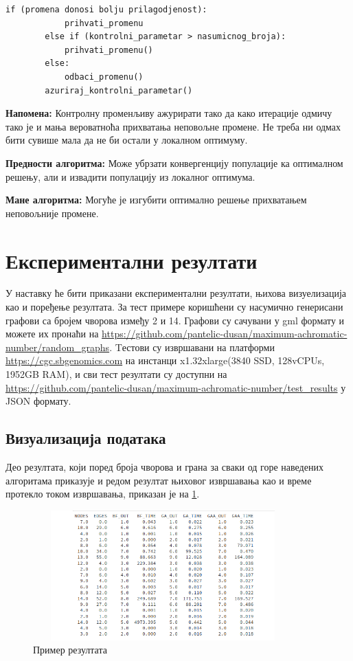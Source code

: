 \documentclass[a4paper]{article}
\begin{document}
{\begin{lstlisting}[caption={Псеудо-код симулираног каљења},frame=single]
		if (promena donosi bolju prilagodjenost):
			prihvati_promenu
		else if (kontrolni_parametar > nasumicnog_broja):
			prihvati_promenu()
		else:
			odbaci_promenu()
		azuriraj_kontrolni_parametar()
\end{lstlisting}

\textbf{Напомена:} Контролну променљиву ажурирати тако да како итерације одмичу тако је и мања вероватноћа прихватања неповољне промене. Не треба ни одмах бити сувише мала да не би остали у локалном оптимуму.

\textbf{Предности алгоритма:} Може убрзати конвергенцију популације ка оптималном решењу, али и извадити популацију из локалног оптимума.

\textbf{Мане алгоритма:} Могуће је изгубити оптимално решење прихватањем неповољније промене.

\section{Експериментални резултати}
\label{sec:experimet-results}
У наставку ће бити приказани експериментални резултати, њихова визуелизација као и поређење резултата. За тест примере коришћени су насумично генерисани графови са бројем чворова између 2 и 14. Графови су сачувани у gml формату и можете их пронаћи на \url{https://github.com/pantelic-dusan/maximum-achromatic-number/random_graphs}. Tестови су извршавани на платформи \url{https://cgc.sbgenomics.com} на инстанци x1.32xlarge(3840 SSD, 128vCPUs, 1952GB RAM), и сви тест резултати су доступни на \url{https://github.com/pantelic-dusan/maximum-achromatic-number/test_results} у JSON формату.

\subsection{Визуализација података}
Део резултата, који поред броја чворова и грана за сваки од горе наведених алгоритама приказује и редом резултат њиховог извршавања као и време протекло током извршавања, приказан је на \ref{data_view}.

\begin{figure}[h!]
	\centering
	\includegraphics[width=10cm, height=5cm]{images/data_view.png}
	\caption{Пример резултата}
	\label{data_view}
\end{figure}

}
\end{document}
